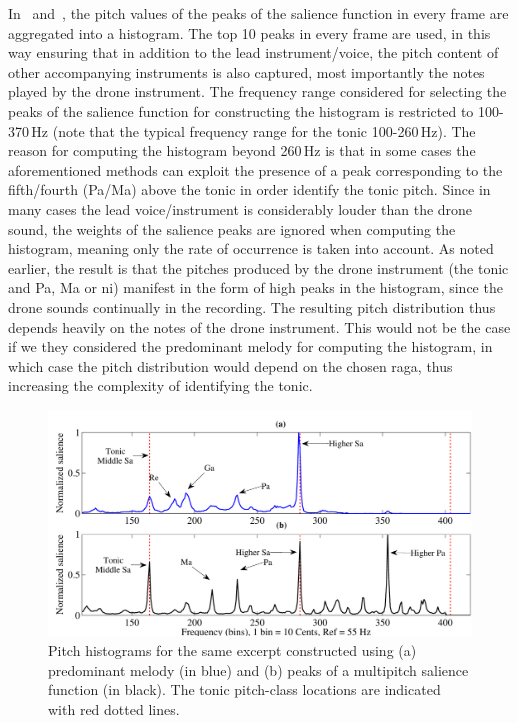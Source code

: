 In~\cite{salamon2012multipitch} and~\cite{gulati2012two}, the pitch values of the peaks of the salience function in every frame are aggregated into a histogram. The top 10 peaks in every frame are used, in this way ensuring that in addition to the lead instrument/voice, the pitch content of other accompanying instruments is also captured, most importantly the notes played by the drone instrument. The frequency range considered for selecting the peaks of the salience function for constructing the histogram is restricted to 100-370\,Hz (note that the typical frequency range for the tonic 100-260\,Hz). The reason for computing the histogram beyond 260\,Hz is that in some cases the aforementioned methods can exploit the presence of a peak corresponding to the fifth/fourth (Pa/Ma) above the tonic in order identify the tonic pitch. Since in many cases the lead voice/instrument is considerably louder than the drone sound, the weights of the salience peaks are ignored when computing the histogram, meaning only the rate of occurrence is taken into account. As noted earlier, the result is that the pitches produced by the drone instrument (the tonic and Pa, Ma or \acrshort{ni}) manifest in the form of high peaks in the histogram, since the drone sounds continually in the recording. The resulting pitch distribution thus depends heavily on the notes of the drone instrument. This would not be the case if we they considered the predominant melody for computing the histogram, in which case the pitch distribution would depend on the chosen \gls{raga}, thus increasing the complexity of identifying the tonic.

\begin{figure}
	\begin{center}
		\includegraphics[width=\figSizeHundred]{ch02_background/figures/Histogram_Melody_Multipitch.pdf}
	\end{center}
	\caption[Pitch histograms constructed using two different methods]{Pitch histograms for the same excerpt constructed using (a) predominant melody (in blue) and (b) peaks of a multipitch salience function (in black). The tonic pitch-class locations are indicated with red dotted lines.}
	\label{fig:background_pitch_histograms_multipitch}
\end{figure}

